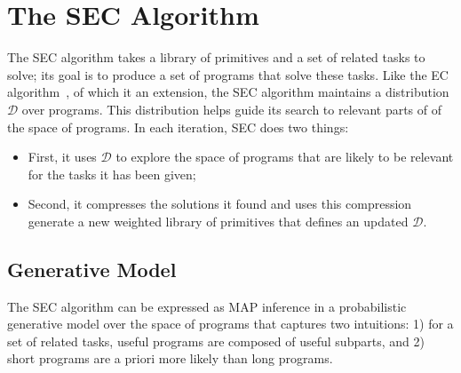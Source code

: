 \documentclass{article} %
\begin{document}



\section{The SEC Algorithm}

The SEC algorithm takes a library of primitives and a set of related tasks to solve; its goal is to produce a set of programs that solve these tasks. Like the EC algorithm~\citep{DBLP:conf/ijcai/DechterMAT13}, of which it an extension, the SEC algorithm maintains a distribution $\mathcal{D}$ over programs. This distribution helps guide its search to relevant parts of of the space of programs. In each iteration, SEC does two things: 
\begin{itemize}
	\item First, it uses $\mathcal{D}$ to explore the space of programs that are likely to be relevant for the tasks it has been given;
	\item Second, it compresses the solutions it found and uses this compression generate a new weighted library of primitives that defines an updated $\mathcal{D}$.
\end{itemize}

\subsection{Generative Model}
The SEC algorithm can be expressed as MAP inference in a probabilistic generative model over the space of programs that captures two intuitions: 1) for a set of related tasks, useful programs are composed of useful subparts, and 2) short programs are a priori more likely than long programs. 
\end{document}
